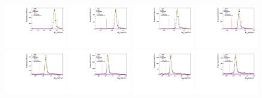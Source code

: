 \begin{figure}\centering
    \includegraphics[width=0.24\textwidth]{figure/fit_mbc/fit_mBC_data4600.pdf}
    \includegraphics[width=0.24\textwidth]{figure/fit_mbc/fit_mBC_data4612.pdf}
    \includegraphics[width=0.24\textwidth]{figure/fit_mbc/fit_mBC_data4626.pdf}
    \includegraphics[width=0.24\textwidth]{figure/fit_mbc/fit_mBC_data4640.pdf}
    \includegraphics[width=0.24\textwidth]{figure/fit_mbc/fit_mBC_data4660.pdf}
    \includegraphics[width=0.24\textwidth]{figure/fit_mbc/fit_mBC_data4680.pdf}
    \includegraphics[width=0.24\textwidth]{figure/fit_mbc/fit_mBC_data4700.pdf}
    \includegraphics[width=0.24\textwidth]{figure/fit_mbc/fit_mBC_data4740.pdf}

\end{figure}
